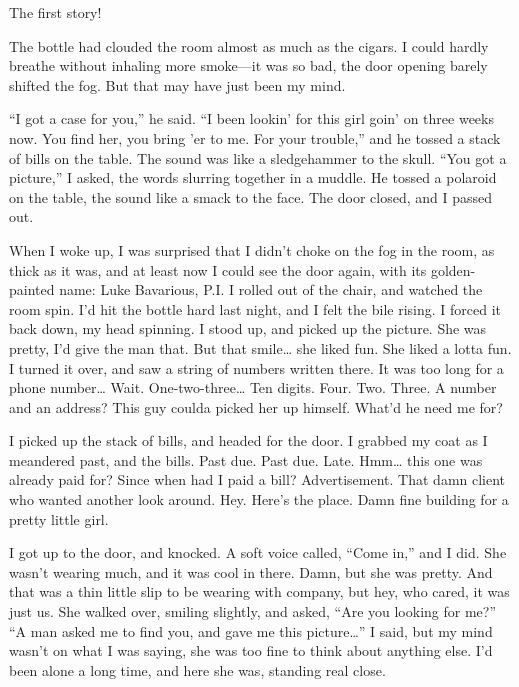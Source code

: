 

The first story!



The bottle had clouded the room almost as much as the cigars. I
could hardly breathe without inhaling more smoke---it was so bad,
the door opening barely shifted the fog. But that may have just
been my mind.

``I got a case for you,'' he said. ``I been lookin' for this girl
goin' on three weeks now. You find her, you bring 'er to me. For
your trouble,'' and he tossed a stack of bills on the table. The
sound was like a sledgehammer to the skull. ``You got a picture,'' I
asked, the words slurring together in a muddle. He tossed a
polaroid on the table, the sound like a smack to the face. The door
closed, and I passed out.

When I woke up, I was surprised that I didn't choke on the fog in
the room, as thick as it was, and at least now I could see the door
again, with its golden-painted name: Luke Bavarious, P.I. I rolled
out of the chair, and watched the room spin. I'd hit the bottle
hard last night, and I felt the bile rising. I forced it back down,
my head spinning. I stood up, and picked up the picture. She was
pretty, I'd give the man that. But that smile{\ldots} she liked fun. She
liked a lotta fun. I turned it over, and saw a string of numbers
written there. It was too long for a phone number{\ldots} Wait.
One-two-three{\ldots} Ten digits. Four. Two. Three. A number and an
address? This guy coulda picked her up himself. What'd he need me
for?

I picked up the stack of bills, and headed for the door. I grabbed
my coat as I meandered past, and the bills. Past due. Past due.
Late. Hmm{\ldots} this one was already paid for? Since when had I paid a
bill? Advertisement. That damn client who wanted another look
around. Hey. Here's the place. Damn fine building for a pretty
little girl.

I got up to the door, and knocked. A soft voice called, ``Come in,''
and I did. She wasn't wearing much, and it was cool in there. Damn,
but she was pretty. And that was a thin little slip to be wearing
with company, but hey, who cared, it was just us. She walked over,
smiling slightly, and asked, ``Are you looking for me?'' ``A man asked
me to find you, and gave me this picture{\ldots}'' I said, but my mind
wasn't on what I was saying, she was too fine to think about
anything else. I'd been alone a long time, and here she was,
standing real close.

